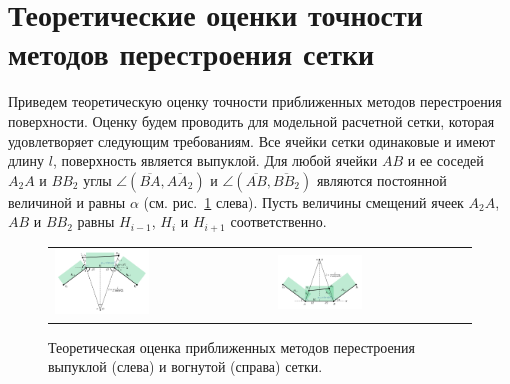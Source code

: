 \documentclass[
11pt,%
tightenlines,%
twoside,%
onecolumn,%
nofloats,%
nobibnotes,%
nofootinbib,%
superscriptaddress,%
noshowpacs,%
centertags]%
{revtex4}
\begin{document}

\section{Теоретические оценки точности методов перестроения сетки}

Приведем теоретическую оценку точности приближенных методов перестроения поверхности.
Оценку будем проводить для модельной расчетной сетки, которая удовлетворяет следующим требованиям.
Все ячейки сетки одинаковые и имеют длину $l$, поверхность является выпуклой.
Для любой ячейки $AB$ и ее соседей $A_2A$ и $BB_2$ углы $\angle (\overline{BA}, \overline{AA_2})$ и $\angle (\overline{AB}, \overline{BB_2})$ являются постоянной величиной и равны $\alpha$ (см. рис.~\ref{fig:text_1_remesh_2d_theoretical} слева).
Пусть величины смещений ячеек $A_2A$, $AB$ и $BB_2$ равны $H_{i - 1}$, $H_i$ и $H_{i + 1}$ соответственно.

\begin{figure}[ht]
\setcaptionmargin{5mm}
\onelinecaptionsfalse %
\begin{tabular}{ll}
\includegraphics[width=0.45\textwidth]{pics/theoretical.pdf}
&
\includegraphics[width=0.45\textwidth]{pics/theoretical_concave.pdf}
\end{tabular}
\caption{Теоретическая оценка приближенных методов перестроения выпуклой (слева) и вогнутой (справа) сетки.}
\label{fig:text_1_remesh_2d_theoretical}
\end{figure}
\end{document}
